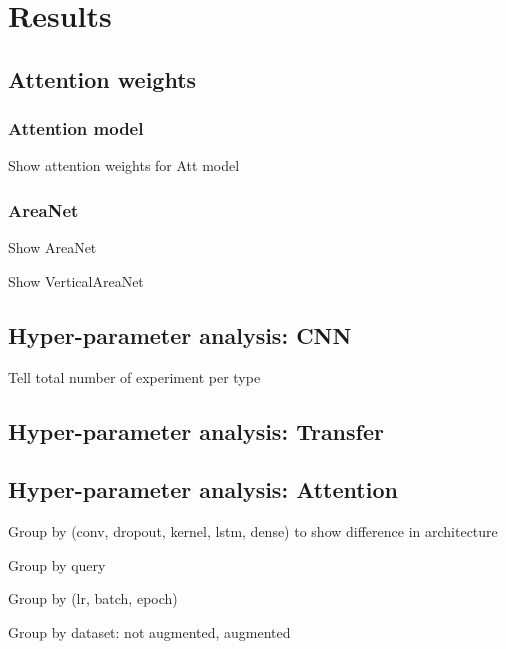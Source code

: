 
\section{Results}
\label{sec:results}

\subsection{Attention weights}

\subsubsection{Attention model}

Show attention weights for Att model

\subsubsection{AreaNet}

Show AreaNet

Show VerticalAreaNet

\subsection{Hyper-parameter analysis: CNN}


Tell total number of experiment per type

\subsection{Hyper-parameter analysis: Transfer}

\subsection{Hyper-parameter analysis: Attention}

Group by (conv, dropout, kernel, lstm, dense) to show difference in architecture

Group by query

Group by (lr, batch, epoch)

Group by dataset: not augmented, augmented


